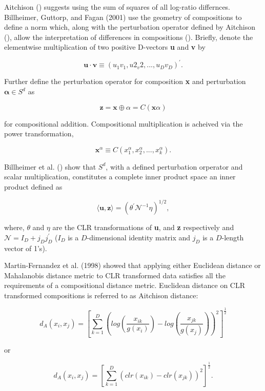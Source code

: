 \documentclass{article}\usepackage[]{graphicx}\usepackage[]{color}
\begin{document}
Aitchison (\cite{Aitchison1986, Aitchison1992}) suggests using the sum of squares of all log-ratio differnces.  Billheimer, Guttorp, and Fagan (2001) use the geometry of compositions to define a norm which, along with the perturbation operator defined by Aitchison (\cite{Aitchison1986}), allow the interpretation of differences in compositions (\cite{Billheimer2001}). Briefly, denote the elementwise multiplication of two positive D-vectors \textbf{u} and \textbf{v} by  

$$\mathbf{u}\cdot \mathbf{v} \equiv \left( u_1v_1, u2_v2, ..., u_Dv_D\right)^\prime.$$

Further define the perturbation operator for composition \textbf{x} and perturbation $\mathbf{\alpha} \in S^{d}$ as

$$\mathbf{z} = \mathbf{x}\oplus \alpha = C\left(\mathbf{x}\alpha \right)$$

for compositional addition.  Compositional multiplication is acheived via the power transformation, 

$$\mathbf{x}^\alpha \equiv C\left(x_1^\alpha, x_2^\alpha, ..., x_k^\alpha \right).$$

Billheimer et al. (\cite{Billheimer2001}) show that $S^d$, with a defined perturbation orperator and scalar multiplication, constitutes a complete inner product space an inner product defined as

$$\langle \mathbf{u,z} \rangle = \left( \theta^{\prime}\mathcal{N}^{-1}\eta \right)^{1/2},$$

where, $\theta$ and $\eta$ are the CLR transformations of \textbf{u}, and \textbf{z} respectively and $\mathcal{N} = I_D + j_D^{} j_D^{\prime}$ ($I_D$ is a $D$-dimensional identity matrix and $j_D$ is a $D$-length vector of 1's).



Martin-Fernandez et al. (1998) showed that applying either Euclidean distance or Mahalanobis distance metric to CLR transformed data satisfies all the requirements of a compositional distance metric. Euclidean distance on CLR transformed compositions is referred to as Aitchison distance:

$$d_A(x_i, x_j) = \left[\sum_{k=1}^D \left( log \left(\frac{x_{ik}}{g(x_i)} \right) - log \left(\frac{x_{jk}}{g(x_j)} \right) \right)^2  \right]^\frac{1}{2}$$

or 

$$d_A(x_i, x_j) = \left[\sum_{k=1}^D \left( clr(x_{ik}) - clr(x_{jk}) \right)^2  \right]^\frac{1}{2}.$$


\end{document}
